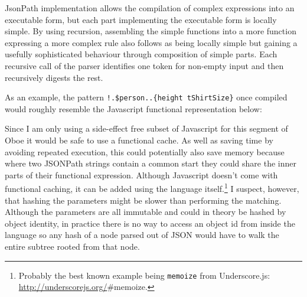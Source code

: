 \documentclass[]{article}
\newenvironment{Shaded}{}{}
\newcommand{\StringTok}[1]{\textcolor[rgb]{0.25,0.44,0.63}{{#1}}}
\newcommand{\CommentTok}[1]{\textcolor[rgb]{0.38,0.63,0.69}{\textit{{#1}}}}
\newcommand{\FunctionTok}[1]{\textcolor[rgb]{0.02,0.16,0.49}{{#1}}}
\newcommand{\NormalTok}[1]{{#1}}
\begin{document}
JsonPath implementation allows the compilation of complex expressions
into an executable form, but each part implementing the executable form
is locally simple. By using recursion, assembling the simple functions
into a more function expressing a more complex rule also follows as
being locally simple but gaining a usefully sophisticated behaviour
through composition of simple parts. Each recursive call of the parser
identifies one token for non-empty input and then recursively digests
the rest.

As an example, the pattern \texttt{!.\$person..\{height tShirtSize\}}
once compiled would roughly resemble the Javascript functional
representation below:

\begin{Shaded}
\end{Shaded}

Since I am only using a side-effect free subset of Javascript for this
segment of Oboe it would be safe to use a functional cache. As well as
saving time by avoiding repeated execution, this could potentially also
save memory because where two JSONPath strings contain a common start
they could share the inner parts of their functional expression.
Although Javascript doesn't come with functional caching, it can be
added using the language itself.\footnote{Probably the best known
  example being \texttt{memoize} from Underscore.js:
  \url{http://underscorejs.org/}\#memoize.} I suspect, however, that
hashing the parameters might be slower than performing the matching.
Although the parameters are all immutable and could in theory be hashed
by object identity, in practice there is no way to access an object id
from inside the language so any hash of a node parsed out of JSON would
have to walk the entire subtree rooted from that node.
\end{document}
